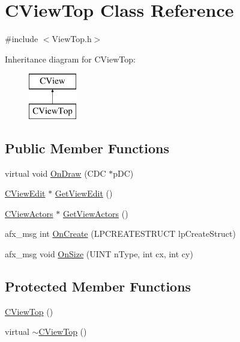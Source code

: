\hypertarget{class_c_view_top}{}\section{C\+View\+Top Class Reference}
\label{class_c_view_top}


{\ttfamily \#include $<$View\+Top.\+h$>$}

Inheritance diagram for C\+View\+Top\+:\begin{figure}[H]
\begin{center}
\leavevmode
\includegraphics[height=2.000000cm]{class_c_view_top}
\end{center}
\end{figure}
\subsection*{Public Member Functions}
\begin{DoxyCompactItemize}
\item 
virtual void \hyperlink{class_c_view_top_ac4b8af93a75df56478f39feff289f6a6}{On\+Draw} (C\+D\+C $\ast$p\+D\+C)
\item 
\hyperlink{class_c_view_edit}{C\+View\+Edit} $\ast$ \hyperlink{class_c_view_top_a775f50213ecac76ac57016bc402de42a}{Get\+View\+Edit} ()
\item 
\hyperlink{class_c_view_actors}{C\+View\+Actors} $\ast$ \hyperlink{class_c_view_top_a2057cf44f1f7a789b33e2ef8444b6db8}{Get\+View\+Actors} ()
\item 
afx\+\_\+msg int \hyperlink{class_c_view_top_a7e4cad13135855a66719ecb49a8ad3fc}{On\+Create} (L\+P\+C\+R\+E\+A\+T\+E\+S\+T\+R\+U\+C\+T lp\+Create\+Struct)
\item 
afx\+\_\+msg void \hyperlink{class_c_view_top_a171e02fdf1bef80245bbc37d77819f14}{On\+Size} (U\+I\+N\+T n\+Type, int cx, int cy)
\end{DoxyCompactItemize}
\subsection*{Protected Member Functions}
\begin{DoxyCompactItemize}
\item 
\hyperlink{class_c_view_top_a4cee9890cf66890c3cd79efdedf92d1b}{C\+View\+Top} ()
\item 
virtual \hyperlink{class_c_view_top_ad08e0ef0c01e33bb0278dc595467ad8c}{$\sim$\+C\+View\+Top} ()
\end{DoxyCompactItemize}


